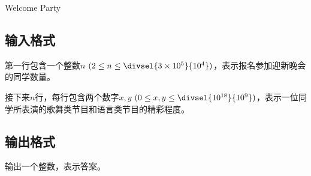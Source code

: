 \begin{Problem}{Welcome Party}{}
\subsection*{输入格式}

第一行包含一个整数$n$ $(2 \leq n \leq \divsel{3 \times 10^5}{10^4})$，表示报名参加迎新晚会的同学数量。

接下来$n$行，每行包含两个数字$x, y$ $(0 \leq x, y \leq \divsel{10^{18}}{10^9})$，表示一位同学所表演的歌舞类节目和语言类节目的精彩程度。

\ifodd\value{page}
\newpage
\fi

\subsection*{输出格式}

输出一个整数，表示答案。


\end{Problem}
